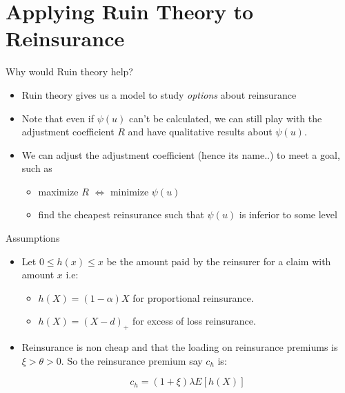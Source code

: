 \documentclass[11pt]{beamer}
\begin{document}
\section{Applying Ruin Theory to Reinsurance}
\begin{frame}{Why would Ruin theory help?}

\begin{itemize}
\item Ruin theory gives us a model to study \textit{options} about reinsurance

\vfill

\item Note that even if $\psi(u)$ can't be calculated, we can still play with the adjustment coefficient $R$ and have qualitative results about $\psi(u)$.


\vfill

\item We can adjust the adjustment coefficient (hence its name..) to meet a goal, such as
\begin{itemize}
\item maximize $R$ $\Leftrightarrow$ minimize $\psi(u)$
\item find the cheapest reinsurance such that $\psi(u)$ is inferior to some level
\end{itemize}
\end{itemize}

\end{frame}
\begin{frame}{Assumptions}

\begin{itemize}

\item Let $0\le h(x) \le x$ be the amount paid by the reinsurer for a claim with amount $x$ i.e:

\begin{itemize}
\item $h(X)=(1-\alpha)X$ for proportional reinsurance.

\item $h(X)=(X-d)_+$ for excess of loss reinsurance.
\end{itemize}

\vfill

\item Reinsurance is non cheap and that the loading on reinsurance premiums is $\xi>\theta > 0$. So the reinsurance premium say $c_{h}$ is:

$$c_h=(1+\xi)\lambda E[h(X)]$$



\end{itemize}

\end{frame}
\end{document}
